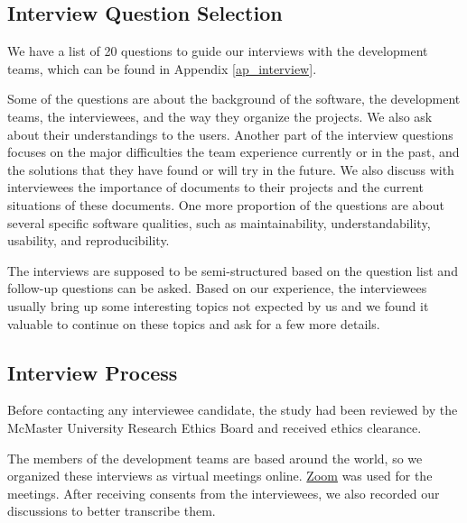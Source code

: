 \subsection{Interview Question Selection}

We have a list of 20 questions to guide our interviews with the development teams, which can be found in Appendix \ref{ap_interview}.

Some of the questions are about the background of the software, the development teams, the interviewees, and the way they organize the projects. We also ask about their understandings to the users. Another part of the interview questions focuses on the major difficulties the team experience currently or in the past, and the solutions that they have found or will try in the future. We also discuss with interviewees the importance of documents to their projects and the current situations of these documents. One more proportion of the questions are about several specific software qualities, such as maintainability, understandability, usability, and reproducibility.

The interviews are supposed to be semi-structured based on the question list and follow-up questions can be asked. Based on our experience, the interviewees usually bring up some interesting topics not expected by us and we found it valuable to continue on these topics and ask for a few more details.

\subsection{Interview Process}
Before contacting any interviewee candidate, the study had been reviewed by the McMaster University Research Ethics Board and received ethics clearance.

The members of the development teams are based around the world, so we organized these interviews as virtual meetings online. \hyperlink{https://zoom.us/}{Zoom} was used for the meetings. After receiving consents from the interviewees, we also recorded our discussions to better transcribe them.
